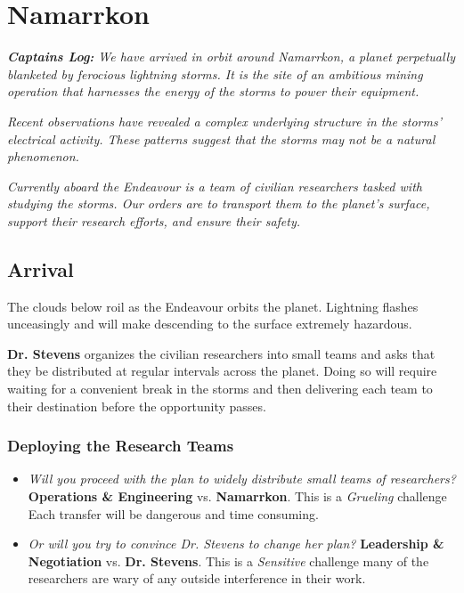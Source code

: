\documentclass[11pt, a5paper, parskip=half-, DIV=12]{scrartcl}
\begin{document}
\section*{Namarrkon}
\textit{\textbf{Captains Log:} We have arrived in orbit around Namarrkon, a planet perpetually blanketed by ferocious lightning storms. It is the site of an ambitious mining operation that harnesses the energy of the storms to power their equipment.}

\textit{Recent observations have revealed a complex underlying structure in the storms' electrical activity. These patterns suggest that the storms may not be a natural phenomenon.}

\textit{Currently aboard the Endeavour is a team of civilian researchers tasked with studying the storms. Our orders are to transport them to the planet's surface, support their research efforts, and ensure their safety.}

\subsection*{Arrival}
The clouds below roil as the Endeavour orbits the planet. Lightning flashes unceasingly and will make descending to the surface extremely hazardous. 

\textbf{Dr. Stevens} organizes the civilian researchers into small teams and asks that they be distributed at regular intervals across the planet. Doing so will require waiting for a convenient break in the storms and then delivering each team to their destination before the opportunity passes.

\subsubsection*{Deploying the Research Teams}
\begin{itemize}
	\item \textit{Will you proceed with the plan to widely distribute small teams of researchers?} \textbf{Operations \& Engineering} vs. \textbf{Namarrkon}. This is a \textit{Grueling} challenge \textemdash{} Each transfer will be dangerous and time consuming.
	\item \textit{Or will you try to convince Dr. Stevens to change her plan?} \textbf{Leadership \& Negotiation} vs. \textbf{Dr. Stevens}. This is a \textit{Sensitive} challenge \textemdash{} many of the researchers are wary of any outside interference in their work.
\end{itemize}
\end{document}
